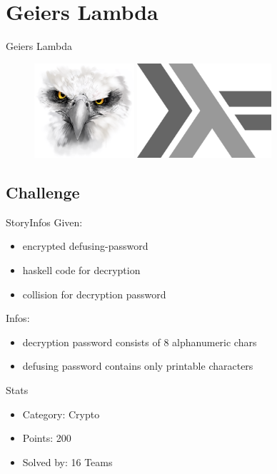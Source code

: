 \section{Geiers Lambda}
\begin{frame}{Geiers Lambda}
    \begin{figure}[!htb]
        \includegraphics[height=35mm]{data/eagle.png}\hspace{10mm}
        \includegraphics[height=35mm]{data/haskell.png}
    \end{figure}
\end{frame}

\subsection{Challenge}
\begin{frame}{Story}{Infos}
    Given:
    \begin{itemize}
        \item encrypted defusing-password
        \item haskell code for decryption
        \item collision for decryption password
    \end{itemize}

    Infos:
    \begin{itemize}
        \item decryption password consists of 8 alphanumeric chars
        \item defusing password contains only printable characters
    \end{itemize}
\end{frame}

\begin{frame}{Stats}
    \begin{itemize}
        \item Category: Crypto
        \item Points: 200
        \item Solved by: 16 Teams
    \end{itemize}
\end{frame}

